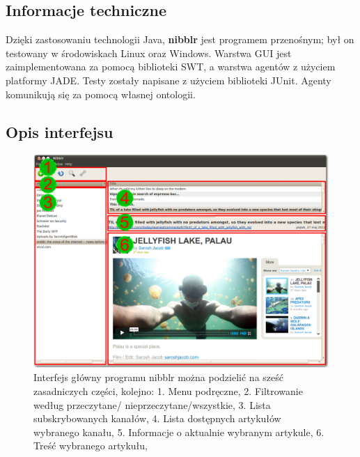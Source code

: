 \documentclass[a4paper,11pt]{report}
\begin{document}
\subsection{Informacje techniczne}

Dzięki zastosowaniu technologii Java, \textbf{nibblr} jest programem przenośnym; był on testowany
w środowiskach Linux oraz Windows. Warstwa GUI jest zaimplementowana za pomocą biblioteki SWT,
a warstwa agentów z użyciem platformy JADE. Testy zostały napisane z użyciem biblioteki JUnit.
Agenty komunikują się za pomocą własnej ontologii.

\newpage
\subsection{Opis interfejsu}

\begin{figure}[h]
	\includegraphics[scale=0.27]{./img/nibblr1.png}
	\caption{Interfejs główny programu nibblr można podzielić na sześć 
		zasadniczych części, kolejno: 
		\newline \hspace* {1,5cm}1. Menu podręczne,
		\newline \hspace* {1,5cm}2. Filtrowanie według przeczytane/
					    nieprzeczytane/wszystkie,
		\newline \hspace* {1,5cm}3. Lista subskrybowanych kanałów,
		\newline \hspace* {1,5cm}4. Lista dostępnych artykułów
					    wybranego kanału,
		\newline \hspace* {1,5cm}5. Informacje o aktualnie wybranym
					    artykule, 
		\newline \hspace* {1,5cm}6. Treść wybranego artykułu,
	}
	\label{fig:interface6}
\end{figure}
\end{document}
